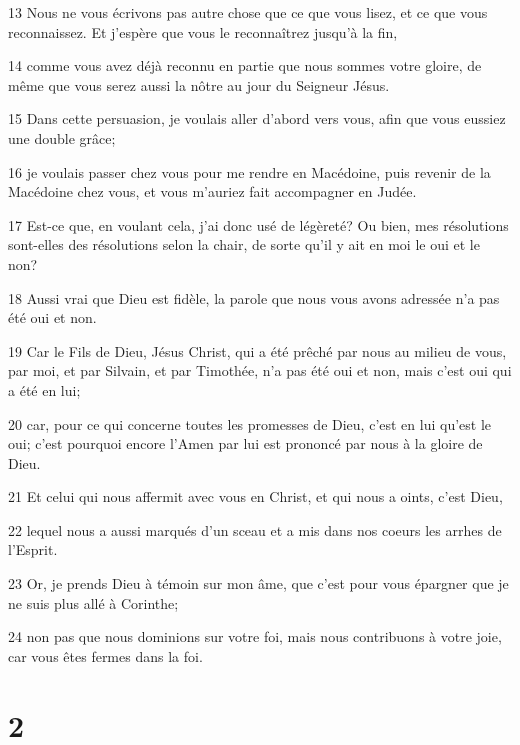 \par 13 Nous ne vous écrivons pas autre chose que ce que vous lisez, et ce que vous reconnaissez. Et j'espère que vous le reconnaîtrez jusqu'à la fin,
\par 14 comme vous avez déjà reconnu en partie que nous sommes votre gloire, de même que vous serez aussi la nôtre au jour du Seigneur Jésus.
\par 15 Dans cette persuasion, je voulais aller d'abord vers vous, afin que vous eussiez une double grâce;
\par 16 je voulais passer chez vous pour me rendre en Macédoine, puis revenir de la Macédoine chez vous, et vous m'auriez fait accompagner en Judée.
\par 17 Est-ce que, en voulant cela, j'ai donc usé de légèreté? Ou bien, mes résolutions sont-elles des résolutions selon la chair, de sorte qu'il y ait en moi le oui et le non?
\par 18 Aussi vrai que Dieu est fidèle, la parole que nous vous avons adressée n'a pas été oui et non.
\par 19 Car le Fils de Dieu, Jésus Christ, qui a été prêché par nous au milieu de vous, par moi, et par Silvain, et par Timothée, n'a pas été oui et non, mais c'est oui qui a été en lui;
\par 20 car, pour ce qui concerne toutes les promesses de Dieu, c'est en lui qu'est le oui; c'est pourquoi encore l'Amen par lui est prononcé par nous à la gloire de Dieu.
\par 21 Et celui qui nous affermit avec vous en Christ, et qui nous a oints, c'est Dieu,
\par 22 lequel nous a aussi marqués d'un sceau et a mis dans nos coeurs les arrhes de l'Esprit.
\par 23 Or, je prends Dieu à témoin sur mon âme, que c'est pour vous épargner que je ne suis plus allé à Corinthe;
\par 24 non pas que nous dominions sur votre foi, mais nous contribuons à votre joie, car vous êtes fermes dans la foi.

\chapter{2}

